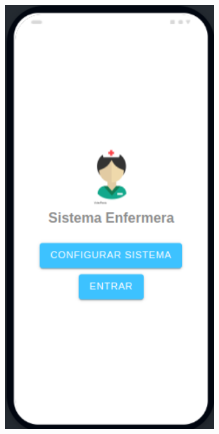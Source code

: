 \begin{figure}[!htpb]
     \centering
     \begin{subfigure}[b]{0.3\textwidth}
         \centering
         \includegraphics[width=1.1\textwidth]{./Figures/app/main-page.png}

\end{subfigure}
\end{figure}
